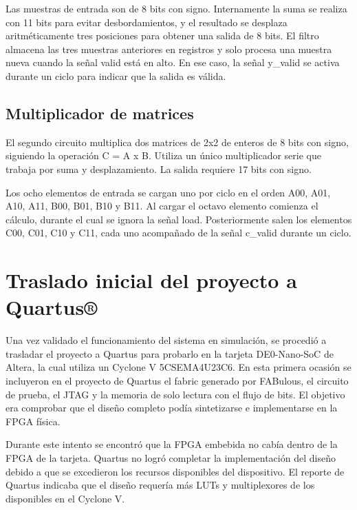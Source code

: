 Las muestras de entrada son de 8 bits con signo. Internamente la suma se realiza con 11 bits para evitar desbordamientos, y el resultado se desplaza aritméticamente tres posiciones para obtener una salida de 8 bits. El filtro almacena las tres muestras anteriores en registros y solo procesa una muestra nueva cuando la señal valid está en alto. En ese caso, la señal y\_valid se activa durante un ciclo para indicar que la salida es válida.

\subsection{Multiplicador de matrices}

El segundo circuito multiplica dos matrices de 2x2 de enteros de 8 bits con signo, siguiendo la operación C = A x B. Utiliza un único multiplicador serie que trabaja por suma y desplazamiento. La salida requiere 17 bits con signo.

Los ocho elementos de entrada se cargan uno por ciclo en el orden A00, A01, A10, A11, B00, B01, B10 y B11. Al cargar el octavo elemento comienza el cálculo, durante el cual se ignora la señal load. Posteriormente salen los elementos C00, C01, C10 y C11, cada uno acompañado de la señal c\_valid durante un ciclo. 

\section{Traslado inicial del proyecto a Quartus®}

Una vez validado el funcionamiento del sistema en simulación, se procedió a trasladar el proyecto a Quartus\textregistered{} para probarlo en la tarjeta DE0-Nano-SoC de Altera\textregistered{}, la cual utiliza un Cyclone\textregistered{} V 5CSEMA4U23C6. En esta primera ocasión se incluyeron en el proyecto de Quartus\textregistered{} el fabric generado por FABulous, el circuito de prueba, el JTAG y la memoria de solo lectura con el flujo de bits. El objetivo era comprobar que el diseño completo podía sintetizarse e implementarse en la FPGA física.

Durante este intento se encontró que la FPGA embebida no cabía dentro de la FPGA de la tarjeta. Quartus\textregistered{} no logró completar la implementación del diseño debido a que se excedieron los recursos disponibles del dispositivo. El reporte de Quartus\textregistered{} indicaba que el diseño requería más LUTs y multiplexores de los disponibles en el Cyclone\textregistered{} V.

